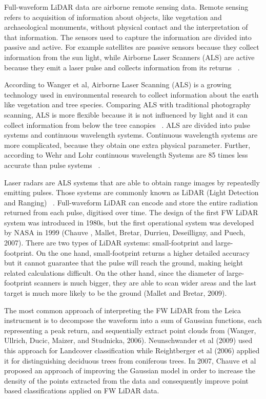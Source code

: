 \documentclass{subfiles}
\begin{document}
	\par Full-waveform LiDAR data are airborne remote sensing data. Remote sensing refers to acquisition of information about objects, like vegetation and archaeological monuments, without physical contact and the interpretation of that information.  The sensors used to capture the information are divided into passive and active. For example satellites are passive sensors because they collect information from the sun light, while Airborne Laser Scanners (ALS) are active because they emit a laser pulse and collects information from its returns ~\cite{Smith2012}.
	
	\par According to Wanger et al, Airborne Laser Scanning (ALS) is a growing technology used in environmental research to collect information about the earth like vegetation and tree species. Comparing ALS with traditional photography scanning, ALS is more flexible because it is not influenced by light and it can collect information from below the tree canopies ~\cite{Wanger2004}. ALS are divided into pulse systems and continuous wavelength systems. Continuous wavelength systems are more complicated, because they obtain one extra physical parameter. Further, according to Wehr and Lohr continuous wavelength Systems are 85 times less accurate than pulse systems ~\cite{Wehr1999}.
	
	\par Laser radars are ALS systems that are able to obtain range images by repeatedly emitting pulses. Those systems are commonly known as LiDAR (Light Detection and Ranging) ~\cite{Wehr1999}. Full-waveform LiDAR can encode and store the entire radiation returned from each pulse, digitised over time. The design of the first FW LiDAR system was introduced in 1980s, but the first operational system was developed by NASA in 1999 (Chauve , Mallet, Bretar, Durrieu, Deseilligny, and Puech, 2007).  There are two types of LiDAR systems: small-footprint and large-footprint. On the one hand, small-footprint returns a higher detailed accuracy but it cannot guarantee that the pulse will reach the ground, making height related calculations difficult. On the other hand, since the diameter of large-footprint scanners is much bigger, they are able to scan wider areas and the last target is much more likely to be the ground (Mallet and Bretar, 2009). 
	
	\par The most common approach of interpreting the FW LiDAR from the Leica instrucment is to decompose the waveform into a sum of Gaussian functions, each representing a peak return, and sequentially extract point clouds from (Wanger, Ullrich, Ducic, Maizer, and Studnicka, 2006). Neunschwander et al (2009) used this approach for Landcover classification while Reightberger et al (2006) applied it for distinguishing deciduous trees from coniferous trees. In 2007, Chauve et al proposed an approach of improving the Gaussian model in order to increase the density of the points extracted from the data and consequently improve point based classifications applied on FW LiDAR data. 
	
\end{document}
